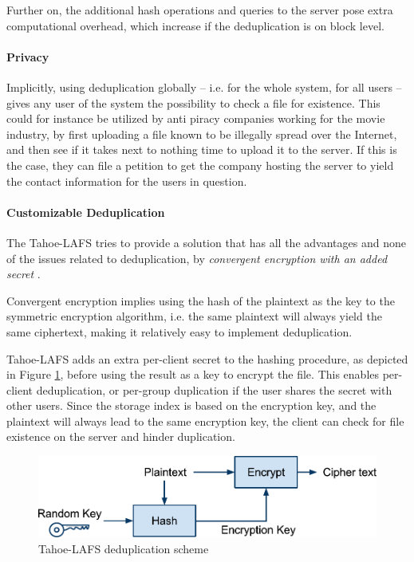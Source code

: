 \documentclass[pdftex,english,10pt,b5paper,twoside]{book}
\begin{document}
Further on, the additional hash operations and queries to the server pose
extra computational overhead, which increase if the deduplication is on block
level.

\paragraph{Privacy} Implicitly, using deduplication globally -- i.e. for the
whole system, for all users -- gives any user of the system the possibility to
check a file for existence. This could for instance be utilized by anti piracy
companies working for the movie industry, by first uploading a file known to be
illegally spread over the Internet, and then see if it takes next to nothing
time to upload it to the server. If this is the case, they can file a petition
to get the company hosting the server to yield the contact information for the
users in question.

\paragraph{Customizable Deduplication} The Tahoe-\ac{LAFS} tries to provide a
solution that has all the advantages and none of the issues related to
deduplication, by \emph{convergent encryption with an added secret}
\cite{tahoe}.

Convergent encryption implies using the hash of the plaintext as the key to the
symmetric encryption algorithm, i.e. the same plaintext will always yield the
same ciphertext, making it relatively easy to implement deduplication.

Tahoe-\ac{LAFS} adds an extra per-client secret to the hashing procedure, as
depicted in Figure \ref{fig:tahoe:dedup}, before using the result as a key to
encrypt the file. This enables per-client deduplication, or per-group
duplication if the user shares the secret with other users. Since the storage
index is based on the encryption key, and the plaintext will always lead to the
same encryption key, the client can check for file existence on the server and
hinder duplication.

\begin{figure}[!h]
    \centering
    \includegraphics[scale=0.55]{TahoeDeduplication.pdf}
    \caption{Tahoe-LAFS deduplication scheme}
    \label{fig:tahoe:dedup}
\end{figure}
\end{document}
